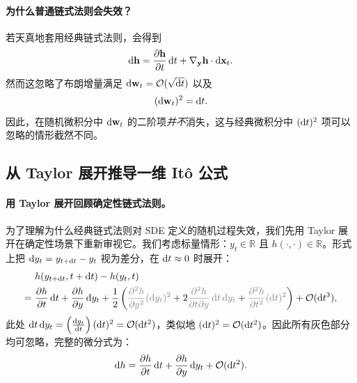 \paragraph{为什么普通链式法则会失效？}
若天真地套用经典链式法则，会得到
\[
\mathop{}\!\mathrm{d} {\mathbf{h}} = \frac{\partial {\mathbf{h}}}{\partial t} \mathop{}\!\mathrm{d} t + \nabla_{{\mathbf{y}}}{\mathbf{h}}  \cdot \mathop{}\!\mathrm{d} {\mathbf{x}}_t.
\]
然而这忽略了布朗增量满足 $\mathop{}\!\mathrm{d} {\mathbf{w}}_t = \mathcal{O}(\sqrt{\mathop{}\!\mathrm{d} t})$ 以及
\[
(\mathop{}\!\mathrm{d} {\mathbf{w}}_t)^2 = \mathop{}\!\mathrm{d} t.
\]
因此，在随机微积分中 $\mathop{}\!\mathrm{d} {\mathbf{w}}_t$ 的二阶项\textit{并不}消失，这与经典微积分中 $(\mathop{}\!\mathrm{d} t)^2$ 项可以忽略的情形截然不同。



\subsection{从 Taylor 展开推导一维 It\^o 公式}\label{subsec:1D-Ito}

\paragraph{用 Taylor 展开回顾确定性链式法则。}
为了理解为什么经典链式法则对 SDE 定义的随机过程失效，我们先用 Taylor 展开在确定性场景下重新审视它。我们考虑标量情形：$y_t \in \mathbb{R}$ 且 $h(\cdot,\cdot)\in \mathbb{R}$。形式上把 $\mathop{}\!\mathrm{d} y_t = y_{t+\mathop{}\!\mathrm{d} t} - y_t$ 视为差分，在 $\mathop{}\!\mathrm{d} t \approx 0$ 时展开：
\begin{align*}
&h(y_{t+\diff t}, t+\diff t) 
- h(y_t, t) \\
= ~&\frac{\partial h}{\partial t} \diff t
+ \frac{\partial h}{\partial y} \diff y_t  + \frac{1}{2} \left(\textcolor{gray}{\frac{\partial^2 h}{\partial y^2}  (\diff y_t)^2}
+ 2 \textcolor{gray}{\frac{\partial^2 h}{\partial t \partial y} \diff t \diff y_t}
+  \textcolor{gray}{\frac{\partial^2 h}{\partial t^2} (\diff t)^2}
\right)
+ \mathcal{O}(\diff t^3),
\end{align*}
此处 $\mathop{}\!\mathrm{d} t \mathop{}\!\mathrm{d} y_t = \left(\frac{\mathop{}\!\mathrm{d} y_t}{\mathop{}\!\mathrm{d} t}\right)(\mathop{}\!\mathrm{d} t)^2 = \mathcal{O}(\mathop{}\!\mathrm{d} t^2)$，类似地 $(\mathop{}\!\mathrm{d} t)^2 = \mathcal{O}(\mathop{}\!\mathrm{d} t^2)$。因此所有灰色部分均可忽略，完整的微分式为：
\[
\mathop{}\!\mathrm{d} h
= \frac{\partial h}{\partial t} \mathop{}\!\mathrm{d} t
+ \frac{\partial h}{\partial y} \mathop{}\!\mathrm{d} y_t
+ \mathcal{O}(\mathop{}\!\mathrm{d} t^2).
\]

